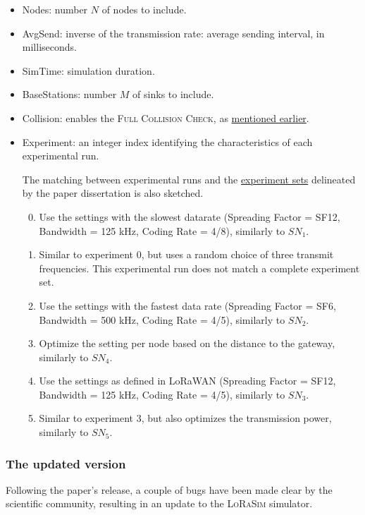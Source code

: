\documentclass[a4paper,11pt]{article} %
\begin{document}
    \begin{itemize}
        \item Nodes: number $N$ of nodes to include.
        \item AvgSend: inverse of the transmission rate: average sending interval, in milliseconds.
        \item SimTime: simulation duration.
        \item BaseStations: number $M$ of sinks to include.
        \item Collision: enables the \textsc{Full Collision Check}, as \hyperref[full-collision]{mentioned earlier}.
        \item Experiment: an integer index identifying the characteristics of each experimental run.

        The matching between experimental runs and the \hyperref[subsec:experiment-sets]{experiment sets} delineated by the paper dissertation is also sketched.
        \begin{enumerate}
            \setcounter{enumi}{-1}
            \item Use the settings with the slowest datarate (Spreading Factor = SF12, Bandwidth = 125 kHz, Coding Rate = 4/8), similarly to $SN_1$.
            \item Similar to experiment 0, but uses a random choice of three transmit frequencies.
            This experimental run does not match a complete experiment set.
            \item Use the settings with the fastest data rate (Spreading Factor = SF6, Bandwidth = 500 kHz, Coding Rate = 4/5), similarly to $SN_2$.
            \item Optimize the setting per node based on the distance to the gateway, similarly to $SN_4$.
            \item Use the settings as defined in LoRaWAN (Spreading Factor = SF12, Bandwidth = 125 kHz, Coding Rate = 4/5), similarly to $SN_3$.
            \item Similar to experiment 3, but also optimizes the transmission power, similarly to $SN_5$.
        \end{enumerate}
    \end{itemize}

    \subsubsection{The updated version}

    Following the paper's release, a couple of bugs have been made clear by the scientific community, resulting in an update to the \textsc{LoRaSim} simulator.
\end{document}
